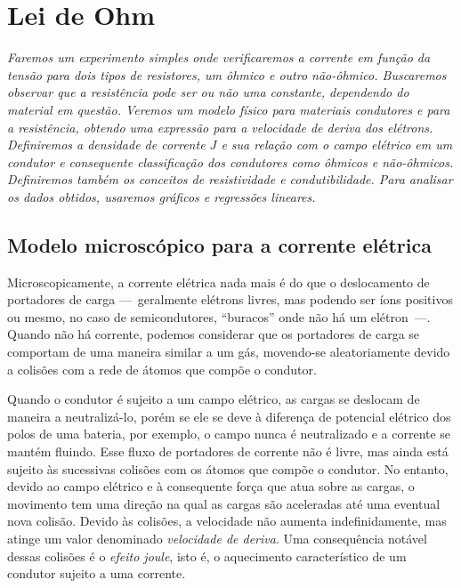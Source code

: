 \chapter{Lei de Ohm} %
\label{Chap:LeiDeOhm}        %

\begin{fullwidth}\it
	Faremos um experimento simples onde verificaremos a corrente em função da tensão para dois tipos de resistores, um ôhmico e outro não-ôhmico. Buscaremos observar que a resistência pode ser ou não uma constante, dependendo do material em questão. Veremos um modelo físico para materiais condutores e para a resistência, obtendo uma expressão para a velocidade de deriva dos elétrons. Definiremos a densidade de corrente $J$ e sua relação com o campo elétrico em um condutor e consequente classificação dos condutores como ôhmicos e não-ôhmicos. Definiremos também os conceitos de resistividade e condutibilidade. Para analisar os dados obtidos, usaremos gráficos e regressões lineares.
\end{fullwidth}

\section{Modelo microscópico para a corrente elétrica}

Microscopicamente, a corrente elétrica nada mais é do que o deslocamento de portadores de carga ---~geralmente elétrons livres, mas podendo ser íons positivos ou mesmo, no caso de semicondutores, ``buracos'' onde não há um elétron~---. Quando não há corrente, podemos considerar que os portadores de carga se comportam de uma maneira similar a um gás, movendo-se aleatoriamente devido a colisões com a rede de átomos que compõe o condutor.

Quando o condutor é sujeito a um campo elétrico, as cargas se deslocam de maneira a neutralizá-lo, porém se ele se deve à diferença de potencial elétrico dos polos de uma bateria, por exemplo, o campo nunca é neutralizado e a corrente se mantém fluindo. Esse fluxo de portadores de corrente não é livre, mas ainda está sujeito às sucessivas colisões com os átomos que compõe o condutor. No entanto, devido ao campo elétrico e à consequente força que atua sobre as cargas, o movimento tem uma direção na qual as cargas são aceleradas até uma eventual nova colisão. Devido às colisões, a velocidade não aumenta indefinidamente, mas atinge um valor denominado \emph{velocidade de deriva}. Uma consequência notável dessas colisões é o \emph{efeito joule}, isto é, o aquecimento característico de um condutor sujeito a uma corrente.

